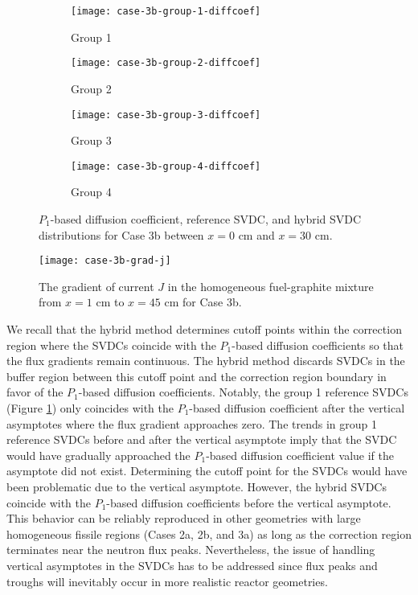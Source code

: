 \begin{figure}[htb!]
  \centering
  \begin{subfigure}[t]{.49\textwidth}
    \centering
    \texttt{[image: case-3b-group-1-diffcoef]}
    \caption{Group 1}
    \label{fig:c3bg1dc}
  \end{subfigure}
  \hfill
  \begin{subfigure}[t]{.49\textwidth}
    \centering
    \texttt{[image: case-3b-group-2-diffcoef]}
    \caption{Group 2}
    \label{fig:c3bg2dc}
  \end{subfigure}
  \begin{subfigure}[t]{.49\textwidth}
    \centering
    \texttt{[image: case-3b-group-3-diffcoef]}
    \caption{Group 3}
    \label{fig:c3bg3dc}
  \end{subfigure}
  \hfill
  \begin{subfigure}[t]{.49\textwidth}
    \centering
    \texttt{[image: case-3b-group-4-diffcoef]}
    \caption{Group 4}
    \label{fig:c3bg4dc}
  \end{subfigure}
  \caption{$P_1$-based diffusion coefficient, reference \gls{SVDC}, and hybrid \gls{SVDC}
    distributions for Case 3b between $x=0$ cm and $x=30$ cm.}
  \label{fig:c3bdiffcoef}
\end{figure}
%
\begin{figure}[htb!]
  \centering
  \texttt{[image: case-3b-grad-j]}
  \caption{The gradient of current $J$ in the homogeneous fuel-graphite mixture from $x=1$ cm to
  $x=45$ cm for Case 3b.}
  \label{fig:c3bgradj}
\end{figure}

We recall that the hybrid method determines cutoff points within the correction region where the
\glspl{SVDC} coincide with the $P_1$-based diffusion coefficients so that the flux gradients
remain continuous. The hybrid method discards \glspl{SVDC} in the buffer region between this
cutoff point and the correction region boundary in favor of the $P_1$-based diffusion coefficients.
Notably, the group 1 reference \glspl{SVDC} (Figure \ref{fig:c3bg1dc}) only coincides
with the $P_1$-based diffusion coefficient after the vertical asymptotes where the flux
gradient approaches zero. The trends in group 1 reference \glspl{SVDC} before and after the
vertical asymptote imply that the \gls{SVDC} would have gradually approached the $P_1$-based
diffusion coefficient value if the asymptote did not exist. Determining the cutoff point for the
\glspl{SVDC} would have been problematic due to the vertical asymptote. However, the hybrid
\glspl{SVDC} coincide with the $P_1$-based diffusion coefficients before the vertical asymptote.
This behavior can be reliably reproduced in other geometries with large homogeneous fissile regions
(Cases 2a, 2b, and 3a) as long as the correction region terminates near the neutron flux peaks.
Nevertheless, the issue of handling vertical asymptotes in the \glspl{SVDC} has to be addressed
since flux peaks and troughs will inevitably occur in more realistic reactor geometries.

